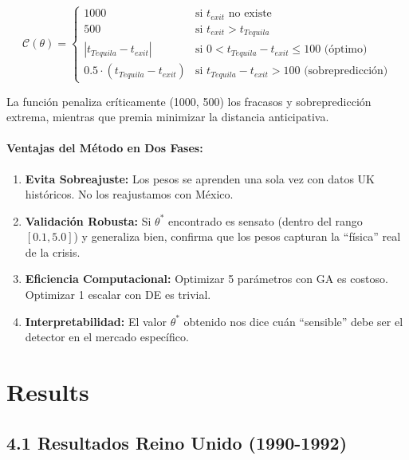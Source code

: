 \begin{equation}
\mathcal{C}(\theta) = \begin{cases}
1000 & \text{si } t_{exit} \text{ no existe} \\
500 & \text{si } t_{exit} > t_{Tequila} \\
|t_{Tequila} - t_{exit}| & \text{si } 0 < t_{Tequila} - t_{exit} \le 100 \text{ (óptimo)} \\
0.5 \cdot (t_{Tequila} - t_{exit}) & \text{si } t_{Tequila} - t_{exit} > 100 \text{ (sobrepredicción)}
\end{cases}
\end{equation}

La función penaliza críticamente (1000, 500) los fracasos y sobrepredicción extrema, mientras que premia minimizar la distancia anticipativa.

\paragraph{Ventajas del Método en Dos Fases:}
\begin{enumerate}
    \item \textbf{Evita Sobreajuste:} Los pesos se aprenden una sola vez con datos UK históricos. No los reajustamos con México.
    \item \textbf{Validación Robusta:} Si $\theta^*$ encontrado es sensato (dentro del rango $[0.1, 5.0]$) y generaliza bien, confirma que los pesos capturan la ``física'' real de la crisis.
    \item \textbf{Eficiencia Computacional:} Optimizar 5 parámetros con GA es costoso. Optimizar 1 escalar con DE es trivial.
    \item \textbf{Interpretabilidad:} El valor $\theta^*$ obtenido nos dice cuán ``sensible'' debe ser el detector en el mercado específico.
\end{enumerate}

\section{Results}

\subsection{4.1 Resultados Reino Unido (1990-1992)}

